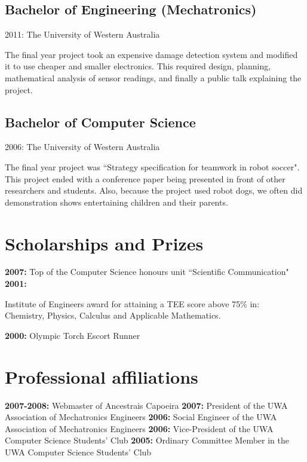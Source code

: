 \documentclass[10pt, a4paper]{report}
\begin{document}
\subsection*{Bachelor of Engineering (Mechatronics)}
	\begin{basedescript}{\desclabelstyle{\pushlabel}\desclabelwidth{2em}}
	\item[2011:] The University of Western Australia
	\end{basedescript}
The final year project took an expensive damage detection system and modified it to use cheaper and smaller electronics. This required design, planning, mathematical analysis of sensor readings, and finally a public talk explaining the project.
\subsection*{Bachelor of Computer Science} %
\begin{basedescript}{\desclabelstyle{\pushlabel}\desclabelwidth{2em}}
	\item[2006:] The University of Western Australia
	\end{basedescript}
The final year project was ``Strategy specification for teamwork in robot soccer". This project ended with a conference paper being presented in front of other researchers and students. Also, because the project used robot dogs, we often did demonstration shows entertaining children and their parents.
\section*{Scholarships and Prizes}
{\bf 2007:} Top of the Computer Science honours unit ``Scientific Communication" \newline
{\bf 2001:} \parbox[t]{32em}{Institute of Engineers award for attaining a TEE score above 75\% in:\\
Chemistry, Physics, Calculus and Applicable Mathematics.} \newline
{\bf 2000:} Olympic Torch Escort Runner	 \newline
\section*{Professional affiliations}
{\bf 2007-2008:} Webmaster of Ancestrais Capoeira \newline
{\bf 2007:} President of the UWA Association of Mechatronics Engineers \newline
{\bf 2006:} Social Engineer of the UWA Association of Mechatronics Engineers \newline
{\bf 2006:} Vice-President of the UWA Computer Science Students' Club \newline
{\bf 2005:} Ordinary Committee Member in the UWA Computer Science Students' Club \newline
\end{document}
